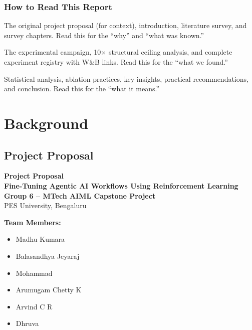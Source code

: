 \documentclass[12pt,a4paper]{report}
\theoremstyle{definition}
\begin{document}
\section*{How to Read This Report}

\begin{description}[nosep, leftmargin=1.5cm, style=nextline]
\item[Part I: Background] The original project proposal (for context), introduction, literature survey, and survey chapters. Read this for the ``why'' and ``what was known.''
\item[Part II: Experiments] The experimental campaign, 10$\times$ structural ceiling analysis, and complete experiment registry with W\&B links. Read this for the ``what we found.''
\item[Part III: Synthesis] Statistical analysis, ablation practices, key insights, practical recommendations, and conclusion. Read this for the ``what it means.''
\end{description}


\part{Background}

\chapter*{Project Proposal}


\begin{center}
\textbf{\Large Project Proposal}\\[0.3cm]
\textbf{\large Fine-Tuning Agentic AI Workflows Using Reinforcement Learning}\\[0.5cm]
\textbf{Group 6 -- MTech AIML Capstone Project}\\[0.3cm]
PES University, Bengaluru\\[0.5cm]
\end{center}

\noindent\textbf{Team Members:}
\begin{itemize}
    \item Madhu Kumara
    \item Balasandhya Jeyaraj
    \item Mohammad
    \item Arumugam Chetty K
    \item Arvind C R
    \item Dhruva
\end{itemize}
\end{document}
